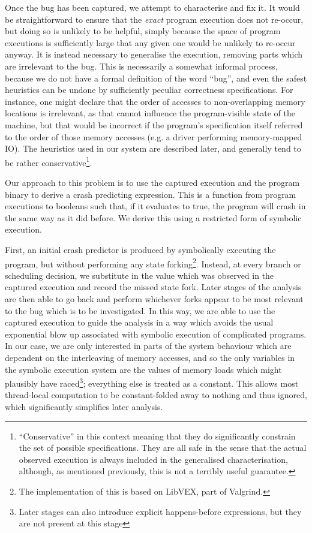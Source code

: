 \documentclass[10pt,a4paper,twocolumn]{article}
\begin{document}
Once the bug has been captured, we attempt to characterise and fix it.
It would be straightforward to ensure that the \emph{exact} program
execution does not re-occur, but doing so is unlikely to be helpful,
simply because the space of program executions is sufficiently large
that any given one would be unlikely to re-occur anyway.  It is instead necessary to
generalise the execution, removing parts which are irrelevant to the
bug.  This is necessarily a somewhat informal process, because we do
not have a formal definition of the word ``bug'', and even the safest
heuristics can be undone by sufficiently peculiar correctness
specifications.  For instance, one might declare that the order of
accesses to non-overlapping memory locations is irrelevant, as that
cannot influence the program-visible state of the machine, but that
would be incorrect if the program's specification itself referred to
the order of those memory accesses (e.g. a driver performing
memory-mapped IO).  The heuristics used in our system are described
later, and generally tend to be rather
conservative\footnote{``Conservative'' in this context meaning that
  they do significantly constrain the set of possible specifications.
  They are all safe in the sense that the actual observed execution is
  always included in the generalised characterisation, although, as
  mentioned previously, this is not a terribly useful guarantee.}.

Our approach to this problem is to use the captured execution and the
program binary to derive a crash predicting expression.  This is a
function from program executions to booleans such that, if it
evaluates to true, the program will crash in the same way as it did
before.  We derive this using a restricted form of symbolic execution.

First, an initial crash predictor is produced by symbolically
executing the program, but without performing any state
forking\footnote{The implementation of this is based on LibVEX, part
  of Valgrind\cite{Nethercote2007}.}.  Instead, at every branch or
scheduling decision, we substitute in the value which was observed in
the captured execution and record the missed state fork.  Later stages
of the analysis are then able to go back and perform whichever forks
appear to be most relevant to the bug which is to be investigated.  In
this way, we are able to use the captured execution to guide the
analysis in a way which avoids the usual exponential blow up
associated with symbolic execution of complicated programs.  In our
case, we are only interested in parts of the system behaviour which
are dependent on the interleaving of memory accesses, and so the only
variables in the symbolic execution system are the values of memory
loads which might plausibly have raced\footnote{Later stages can also
  introduce explicit happens-before expressions, but they are not
  present at this stage}; everything else is treated as a constant.
This allows most thread-local computation to be constant-folded away
to nothing and thus ignored, which significantly simplifies later
analysis.
\end{document}
